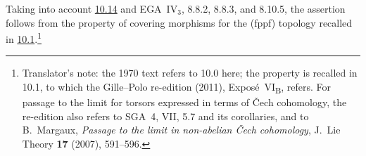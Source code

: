 Taking into account \hyperref[par:sga3-VIB-10.14]{10.14} and
EGA~IV\(_3\), 8.8.2, 8.8.3, and 8.10.5, the assertion follows
from the property of covering morphisms for the
\textup{(fppf)} topology recalled in
\hyperref[par:sga3-VIB-10.1]{10.1}.\footnote{Translator's note: the 1970 text refers to 10.0 here; the property is
recalled in 10.1, to which the Gille--Polo re-edition (2011), Expos\'e~VI\textsubscript{B}, refers. For
passage to the limit for torsors expressed in terms of \v{C}ech cohomology, the re-edition also refers to SGA~4,
VII, 5.7 and its corollaries, and to B.~Margaux, \emph{Passage to the limit in non-abelian \v{C}ech cohomology},
J.\ Lie Theory \textbf{17} (2007), 591--596.}
